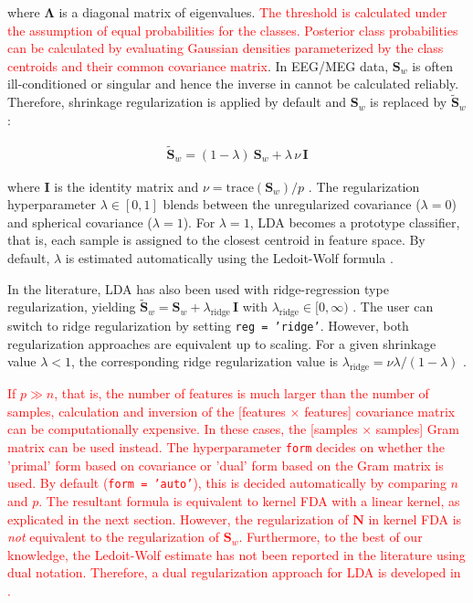 \documentclass[utf8]{frontiersSCNS} %
\newcommand{\I}{\mathbf{I}}
\renewcommand{\S}{\mathbf{S}}
\newcommand{\ttt}[1]{\texttt{#1}}
\newcommand{\red}[1]{\textcolor{red}{#1}}
\begin{document}
where $\mathbf{\Lambda}$ is a diagonal matrix of eigenvalues. 
\red{The threshold is calculated under the assumption of equal probabilities for the classes. Posterior class probabilities can be calculated by evaluating Gaussian densities parameterized by the class centroids and their common covariance matrix}. In EEG/MEG data, $\S_w$ is often ill-conditioned or singular and hence the inverse in  cannot be calculated reliably. Therefore, shrinkage regularization is applied by default and $\S_w$ is replaced by $\widetilde{\S}_w$:

\begin{align}
\label{eq:shrinkage}
\widetilde{\S}_w = (1-\lambda)\ \S_w + \lambda\,\nu\,\I
\end{align}

where $\I$ is the identity matrix and $\nu = \text{trace}(\S_w)/p$ \citep{Blankertz2011}. The regularization hyperparameter $\lambda\in [0,1]$ blends between the unregularized covariance ($\lambda=0$) and spherical covariance ($\lambda=1$). For $\lambda=1$, LDA becomes a prototype classifier, that is, each sample is assigned to the closest centroid in feature space. By default, $\lambda$ is estimated automatically using the Ledoit-Wolf formula \citep{Ledoit2003HoneyMatrix,Blankertz2011}.

In the literature, LDA has also been used with ridge-regression type regularization, yielding $\widetilde{\S}_w = \S_w + \lambda_\text{ridge}\,\I$ with $\lambda_\text{ridge}\in [0,\infty)$ \citep{Friedman1989RegularizedAnalysis}. The user can switch to ridge regularization by setting \ttt{reg = 'ridge'}. However, both regularization approaches are equivalent up to scaling. For a given shrinkage value $\lambda<1$, the corresponding ridge regularization value is $\lambda_\text{ridge} = \nu\lambda / (1-\lambda)$
\citep{Treder2018Cross-validationLDA}.

\red{If $p \gg n$, that is, the number of features is much larger than the number of samples, calculation and inversion of the [features $\times$ features] covariance matrix can be computationally expensive. In these cases, the [samples $\times$ samples] Gram matrix can be used instead. The hyperparameter \ttt{form} decides on whether the 'primal' form based on covariance or 'dual' form based on the Gram matrix is used. By default (\ttt{form = 'auto'}), this is decided automatically by comparing $n$ and  $p$. The resultant formula is equivalent to kernel FDA with a linear kernel, as explicated in the next section. However, the regularization of $\mathbf{N}$ in  kernel FDA is \textit{not} equivalent to the regularization of $\S_w$. Furthermore, to the best of our knowledge, the Ledoit-Wolf estimate has not been reported in the literature using dual notation. Therefore, a dual regularization approach for LDA is developed in \prettyref{app:dualLDA}.}
\end{document}
